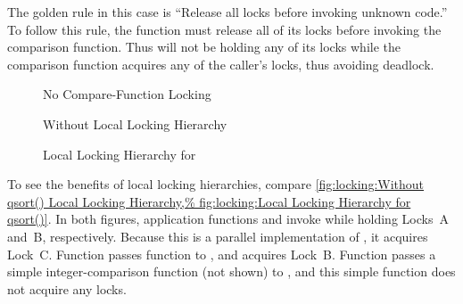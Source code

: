 The golden rule in this case is ``Release all locks before invoking
unknown code.''
To follow this rule, the  function must release all of its
locks before invoking the comparison function.
Thus  will not be holding any of its locks while the comparison
function acquires any of the caller's locks, thus avoiding deadlock.

\QuickQuizEnd

\begin{figure}
\centering
{}
\caption{No  Compare-Function Locking}
\label{fig:locking:No qsort() Compare-Function Locking}
\end{figure}

\begin{figure}
\centering
{}
\caption{Without  Local Locking Hierarchy}
\label{fig:locking:Without qsort() Local Locking Hierarchy}
\end{figure}

\begin{figure}
\centering
{}
\caption{Local Locking Hierarchy for }
\label{fig:locking:Local Locking Hierarchy for qsort()}
\end{figure}

To see the benefits of local locking hierarchies, compare
\cref{fig:locking:Without qsort() Local Locking Hierarchy,%
fig:locking:Local Locking Hierarchy for qsort()}.
In both figures, application functions  and 
invoke  while holding Locks~A and~B, respectively.
Because this is a parallel implementation of , it acquires
Lock~C\@.
Function  passes function  to ,
and  acquires Lock~B\@.
Function  passes a simple integer-comparison function (not
shown) to , and this simple function does not acquire any
locks.

